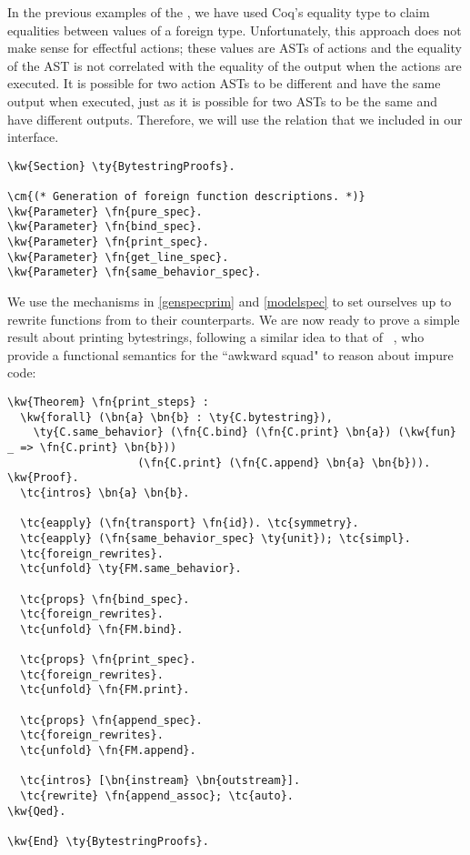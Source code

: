 In the previous examples of the \ffi{}, we have used Coq's equality type \ty{=} to claim equalities between values of a \gls{foreign type}. Unfortunately, this approach does not make sense for effectful actions; these values are ASTs of actions and the equality of the AST is not correlated with the equality of the output when the actions are executed. It is possible for two action ASTs to be different and have the same output when executed, just as it is possible for two ASTs to be the same and have different outputs. Therefore, we will use the  relation that we included in our interface.

\begin{Verbatim}
\kw{Section} \ty{BytestringProofs}.

\cm{(* Generation of foreign function descriptions. *)}
\kw{Parameter} \fn{pure_spec}.
\kw{Parameter} \fn{bind_spec}.
\kw{Parameter} \fn{print_spec}.
\kw{Parameter} \fn{get_line_spec}.
\kw{Parameter} \fn{same_behavior_spec}.
\end{Verbatim}

We use the mechanisms in \autoref{genspecprim} and \autoref{modelspec} to set ourselves up to rewrite functions from  to their  counterparts. We are now ready to prove a simple result about printing bytestrings, following a similar idea to that of \citeauthor{swierstra2007beauty}~\cite{swierstra2007beauty}, who provide a functional semantics for the ``awkward squad" to reason about impure code:
\newpage
\begin{Verbatim}
\kw{Theorem} \fn{print_steps} :
  \kw{forall} (\bn{a} \bn{b} : \ty{C.bytestring}),
    \ty{C.same_behavior} (\fn{C.bind} (\fn{C.print} \bn{a}) (\kw{fun} _ => \fn{C.print} \bn{b}))
                    (\fn{C.print} (\fn{C.append} \bn{a} \bn{b})).
\kw{Proof}.
  \tc{intros} \bn{a} \bn{b}.

  \tc{eapply} (\fn{transport} \fn{id}). \tc{symmetry}.
  \tc{eapply} (\fn{same_behavior_spec} \ty{unit}); \tc{simpl}.
  \tc{foreign_rewrites}.
  \tc{unfold} \ty{FM.same_behavior}.

  \tc{props} \fn{bind_spec}.
  \tc{foreign_rewrites}.
  \tc{unfold} \fn{FM.bind}.

  \tc{props} \fn{print_spec}.
  \tc{foreign_rewrites}.
  \tc{unfold} \fn{FM.print}.

  \tc{props} \fn{append_spec}.
  \tc{foreign_rewrites}.
  \tc{unfold} \fn{FM.append}.

  \tc{intros} [\bn{instream} \bn{outstream}].
  \tc{rewrite} \fn{append_assoc}; \tc{auto}.
\kw{Qed}.

\kw{End} \ty{BytestringProofs}.
\end{Verbatim}

